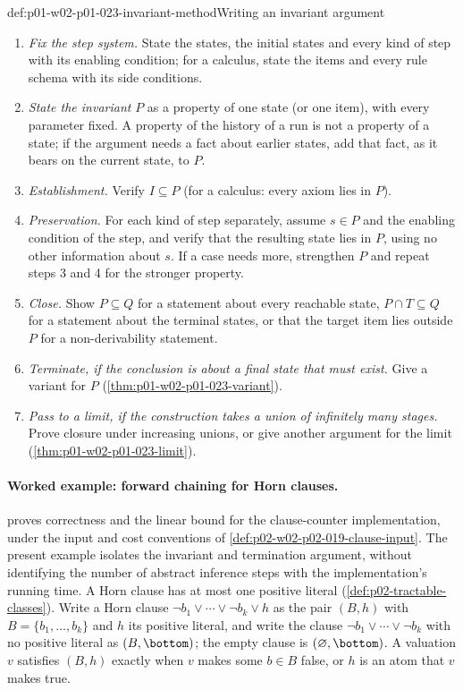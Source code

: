 \begin{hbmethod}{def:p01-w02-p01-023-invariant-method}{Writing an invariant argument}
\begin{enumerate}
  \item \emph{Fix the step system.} State the states, the initial states and
        every kind of step with its enabling condition; for a calculus,
        state the items and every rule schema with its side conditions.
  \item \emph{State the invariant} \(P\) as a property of one state (or one
        item), with every parameter fixed. A property of the history of a
        run is not a property of a state; if the argument needs a fact
        about earlier states, add that fact, as it bears on the current
        state, to \(P\).
  \item \emph{Establishment.} Verify \(I\subseteq P\) (for a calculus: every
        axiom lies in \(P\)).
  \item \emph{Preservation.} For each kind of step separately, assume
        \(s\in P\) and the enabling condition of the step, and verify that
        the resulting state lies in \(P\), using no other information about
        \(s\). If a case needs more, strengthen \(P\) and repeat steps 3
        and 4 for the stronger property.
  \item \emph{Close.} Show \(P\subseteq Q\) for a statement about every
        reachable state, \(P\cap T\subseteq Q\) for a statement about the
        terminal states, or that the target item lies outside \(P\) for a
        non-derivability statement.
  \item \emph{Terminate, if the conclusion is about a final state that must
        exist.} Give a variant for \(P\) (\cref{thm:p01-w02-p01-023-variant}).
  \item \emph{Pass to a limit, if the construction takes a union of
        infinitely many stages.} Prove closure under increasing unions, or
        give another argument for the limit
        (\cref{thm:p01-w02-p01-023-limit}).
\end{enumerate}
\end{hbmethod}

\paragraph{Worked example: forward chaining for Horn clauses.}
 proves correctness and the
linear bound for the clause-counter implementation, under the input and
cost conventions of \cref{def:p02-w02-p02-019-clause-input}.
The present example isolates the invariant and termination argument,
without identifying the number of abstract inference steps with the
implementation's running time. A Horn clause has at most one positive
literal (\cref{def:p02-tractable-classes}). Write a Horn
clause \(\neg b_1\lor\cdots\lor\neg b_k\lor h\) as the pair \((B,h)\) with
\(B=\{b_1,\ldots,b_k\}\) and \(h\) its positive literal, and write the
clause \(\neg b_1\lor\cdots\lor\neg b_k\) with no positive literal as
\((B,\bottom)\); the empty clause is \((\varnothing,\bottom)\). A valuation
\(v\) satisfies \((B,h)\) exactly when \(v\) makes some \(b\in B\) false,
or \(h\) is an atom that \(v\) makes true.

